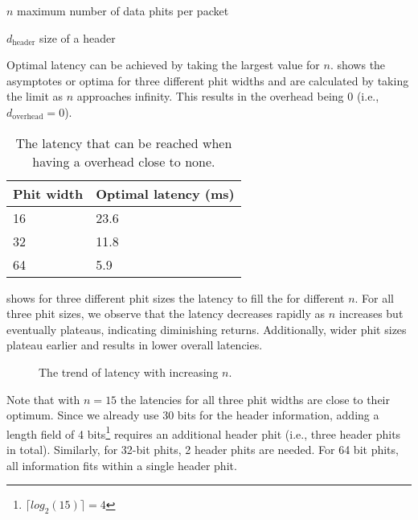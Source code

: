 
\begin{eqexpl}[15mm]
    \item{$n$} maximum number of data phits per packet
    \item{$d_{\text{header}}$} size of a header
\end{eqexpl}

Optimal latency can be achieved by taking the largest value for $n$.
 shows the asymptotes or optima for three different phit widths and are calculated by taking the limit as $n$ approaches infinity.
This results in the overhead being $0$ (i.e., $d_{\text{overhead}} = 0$).

\begin{table}[hbtp]
\centering
\begin{tabular}{@{}ll@{}}
\toprule
\textbf{Phit width} & \textbf{Optimal latency (ms)} \\ \midrule
16        & 23.6                  \\
32        & 11.8                  \\
64        & 5.9                   \\ \bottomrule
\end{tabular}
\caption{The latency that can be reached when having a overhead close to none.}
\label{tab:length_field_optimal_latency}
\end{table}

 shows for three different phit sizes the latency to fill the \graicore{} for different $n$.
For all three phit sizes, we observe that the latency decreases rapidly as $n$ increases but eventually plateaus, indicating diminishing returns.
Additionally, wider phit sizes plateau earlier and results in lower overall latencies.

\begin{figure}[hbtp]
    \centering
    
    \caption{The trend of latency with increasing $n$.}
    \label{fig:n_vs_latency}
\end{figure}

Note that with $n=15$ the latencies for all three phit widths are close to their optimum.
Since we already use 30 bits for the header information, adding a length field of 4 bits\footnote{$\lceil log_{2}( 15 )\rceil = 4$} requires an additional header phit (i.e., three header phits in total). Similarly, for 32-bit phits, 2 header phits are needed. For 64 bit phits, all information fits within a single header phit.

